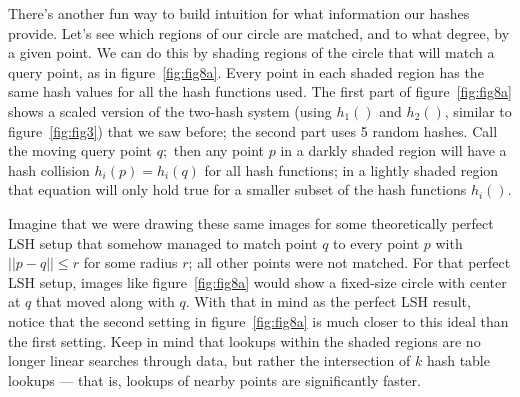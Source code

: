 \documentclass[20pt,]{extarticle}
\begin{document}
There's another fun way to build intuition for what information our
hashes provide. Let's see which regions of our circle are matched, and
to what degree, by a given point. We can do this by shading regions of
the circle that will match a query point, as in figure~\ref{fig:fig8a}.
Every point in each shaded region has the same hash values for all the
hash functions used. The first part of figure~\ref{fig:fig8a} shows a
scaled version of the two-hash system (using \(h_1()\) and \(h_2()\),
similar to figure~\ref{fig:fig3}) that we saw before; the second part
uses 5 random hashes. Call the moving query point \(q;\) then any point
\(p\) in a darkly shaded region will have a hash collision
\(h_i(p) = h_i(q)\) for all hash functions; in a lightly shaded region
that equation will only hold true for a smaller subset of the hash
functions \(h_i().\)

Imagine that we were drawing these same images for some theoretically
perfect LSH setup that somehow managed to match point \(q\) to every
point \(p\) with \(||p-q||\le r\) for some radius \(r\); all other
points were not matched. For that perfect LSH setup, images like
figure~\ref{fig:fig8a} would show a fixed-size circle with center at
\(q\) that moved along with \(q\). With that in mind as the perfect LSH
result, notice that the second setting in figure~\ref{fig:fig8a} is much
closer to this ideal than the first setting. Keep in mind that lookups
within the shaded regions are no longer linear searches through data,
but rather the intersection of \(k\) hash table lookups --- that is,
lookups of nearby points are significantly faster.
\end{document}
